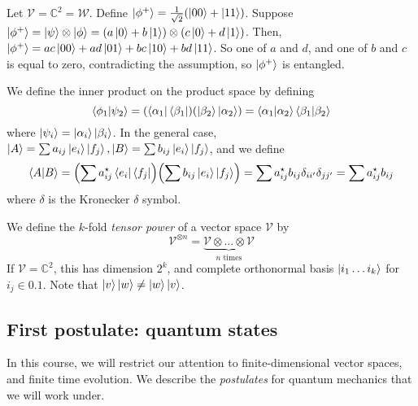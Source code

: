 Let \( \mathcal V = \mathbb C^2 = \mathcal W \).
Define \( \ket{\phi^+} = \frac{1}{\sqrt{2}} \qty(\ket{00} + \ket{11}) \).
Suppose \( \ket{\phi^+} = \ket{\psi}\otimes\ket{\phi} = (a\ket{0} + b\ket{1}) \otimes (c\ket{0} + d\ket{1}) \).
Then, \( \ket{\phi^+} = ac \ket{00} + ad \ket{01} + bc \ket{10} + bd \ket{11} \).
So one of \( a \) and \( d \), and one of \( b \) and \( c \) is equal to zero, contradicting the assumption, so \( \ket{\phi^+} \) is entangled.

We define the inner product on the product space by defining
\[ \ip{\phi_1}{\psi_2} = \qty(\bra{\alpha_1} \bra{\beta_1})\qty(\ket{\beta_2} \ket{\alpha_2}) = \ip{\alpha_1}{\alpha_2} \ip{\beta_1}{\beta_2} \]
where \( \ket{\psi_i} = \ket{\alpha_i}\ket{\beta_i} \).
In the general case, \( \ket{A} = \sum a_{ij} \ket{e_i}\ket{f_j}, \ket{B} = \sum b_{ij} \ket{e_i}\ket{f_j} \), and we define
\[ \ip{A}{B} = \qty(\sum a_{ij}^\star \bra{e_i} \bra{f_j}) \qty(\sum b_{ij} \ket{e_i} \ket{f_j}) = \sum a_{ij}^\star b_{ij} \delta_{ii'}\delta_{jj'} = \sum a_{ij}^\star b_{ij} \]
where \( \delta \) is the Kronecker \( \delta \) symbol.

We define the \( k \)-fold \emph{tensor power} of a vector space \( \mathcal V \) by
\[ \mathcal V^{\otimes n} = \underbrace{\mathcal V \otimes \dots \otimes \mathcal V}_{n \text{ times}} \]
If \( \mathcal V = \mathbb C^2 \), this has dimension \( 2^k \), and complete orthonormal basis \( \ket{i_1 \dots i_k} \) for \( i_j \in \qty{0,1} \).
Note that \( \ket{v}\ket{w} \neq \ket{w}\ket{v} \).

\subsection{First postulate: quantum states}
In this course, we will restrict our attention to finite-dimensional vector spaces, and finite time evolution.
We describe the \emph{postulates} for quantum mechanics that we will work under.

